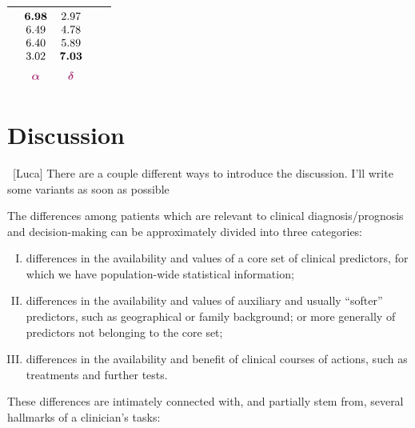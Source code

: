 \documentclass[utf8]{FrontiersinHarvard} %
\newcommand*{\wrench}{{\fontencoding{U}\fontfamily{fontawesomethree}\selectfont\symbol{114}}}
\newcommand{\mynotew}[1]{{\color{notecolour}\wrench\ #1}}
\renewcommand*{\|}[1][]{\nonscript\:#1\vert\nonscript\:\mathopen{}}
\begin{document}
\begin{table}[t]
\begin{tabular}{lcccc}
    &
    $\begin{matrix}\bm{6.98}\\6.49\\6.40\\3.02\\[2\jot]\color{redpurple}\bm{\alpha}\end{matrix}$
    &
    $\begin{matrix}2.97\\4.78\\5.89\\\bm{7.03}\\[2\jot]\color{redpurple}\bm{\delta}\end{matrix}$
    \\[7\jot]
    \hline
  \end{tabular}
\end{table}
\mbox{}
\newpage



\bigskip%
\section{Discussion}
\label{sec:discussion}

\mynotew{[Luca] There are a couple different ways to introduce the discussion. I'll write some variants as soon as possible}

The differences among patients which are relevant to clinical diagnosis/prognosis and decision-making can be approximately divided into three categories:
\begin{enumerate}[I.]
\item\label{item:diff_corepredictors} differences in the availability and values of a core set of clinical predictors, for which we have population-wide statistical information;
\item\label{item:diff_priorinfo} differences in the availability and values of auxiliary and usually \enquote{softer} predictors, such as geographical or family background; or more generally of predictors not belonging to the core set;
\item\label{item:diff_utility} differences in the availability and benefit of clinical courses of actions, such as treatments and further tests.
\end{enumerate}

These differences are intimately connected with, and partially stem from, several hallmarks of a clinician's tasks:
\end{document}
